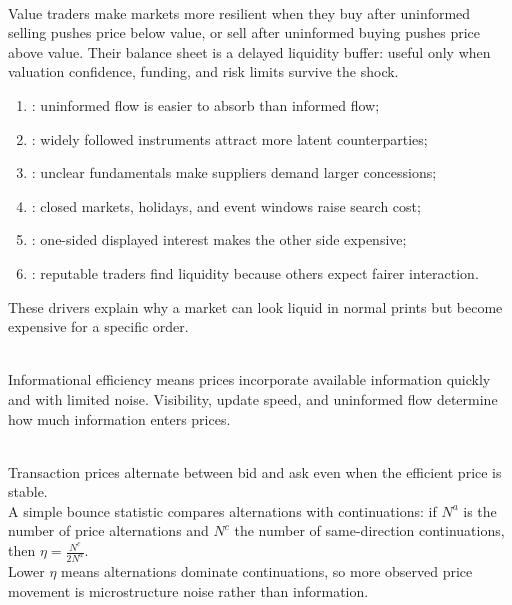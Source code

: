 \documentclass[a4paper,oneside,openany]{book}
\begin{document}
\begin{mechanism} \\
Value traders make markets more resilient when they buy after uninformed selling pushes price below value, or sell after uninformed buying pushes price above value. Their balance sheet is a delayed liquidity buffer: useful only when valuation confidence, funding, and risk limits survive the shock.
\end{mechanism}

\begin{taxonomy} 
\begin{enumerate}[label=\roman*.]
\setlength{\itemsep}{0pt}
\item {}: uninformed flow is easier to absorb than informed flow;
\item {}: widely followed instruments attract more latent counterparties;
\item {}: unclear fundamentals make suppliers demand larger concessions;
\item {}: closed markets, holidays, and event windows raise search cost;
\item {}: one-sided displayed interest makes the other side expensive;
\item {}: reputable traders find liquidity because others expect fairer interaction.
\end{enumerate}
These drivers explain why a market can look liquid in normal prints but become expensive for a specific order.
\end{taxonomy}

\begin{principle} \\
Informational efficiency means prices incorporate available information quickly and with limited noise. Visibility, update speed, and uninformed flow determine how much information enters prices.
\end{principle}

\begin{mechanism} \\
Transaction prices alternate between bid and ask even when the efficient price is stable.\\
A simple bounce statistic compares alternations with continuations: if $N^a$ is the number of price alternations and $N^c$ the number of same-direction continuations, then $\eta=\frac{N^c}{2N^a}$.\\
Lower $\eta$ means alternations dominate continuations, so more observed price movement is microstructure noise rather than information.
\end{mechanism}
\end{document}

